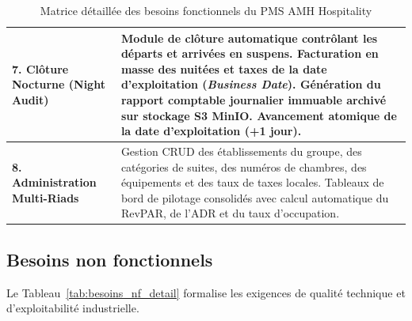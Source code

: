 \begin{table}[H]
\begin{tabularx}{\textwidth}{|p{3.8cm}|X|}
\hline
\textbf{7. Clôture Nocturne (Night Audit)} & Module de clôture automatique contrôlant les départs et arrivées en suspens. Facturation en masse des nuitées et taxes de la date d'exploitation (\textit{Business Date}). Génération du rapport comptable journalier immuable archivé sur stockage S3 MinIO. Avancement atomique de la date d'exploitation (+1 jour). \\
\hline
\textbf{8. Administration Multi-Riads} & Gestion CRUD des établissements du groupe, des catégories de suites, des numéros de chambres, des équipements et des taux de taxes locales. Tableaux de bord de pilotage consolidés avec calcul automatique du RevPAR, de l'ADR et du taux d'occupation. \\
\hline
\end{tabularx}
\caption{Matrice détaillée des besoins fonctionnels du PMS AMH Hospitality}
\label{tab:besoins_f_detail}
\end{table}

\subsection{Besoins non fonctionnels}

Le Tableau~\ref{tab:besoins_nf_detail} formalise les exigences de qualité technique et d'exploitabilité industrielle.

